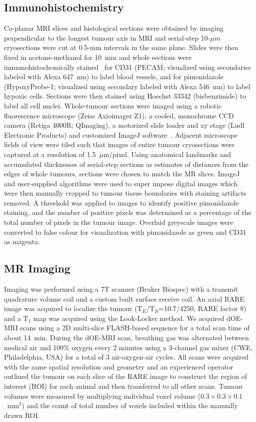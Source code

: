 \subsection{Immunohistochemistry}
Co-planar MRI slices and histological sections were obtained by imaging perpendicular to the longest tumour axis in MRI and serial-step 10-$\mu m$ cryosections were cut at 0.5-mm intervals in the same plane.
Slides were then fixed in acetone-methanol for 10~min and whole sections were immunohistochemically stained~\cite{Kalra:2017is} for CD31 (PECAM; visualized using secondaries labeled with Alexa 647~nm) to label blood vessels, and for pimonidazole (HypoxyProbe-1; visualized using secondary labeled with Alexa 546~nm) to label hypoxic cells. Sections were then stained using Hoechst 33342 (bisbenzimide) to label all cell nuclei.
Whole-tumour sections were imaged using a robotic fluorescence microscope (Zeiss Axioimager Z1), a cooled, monochrome CCD camera (Retiga 4000R; QImaging), a motorized slide loader and xy stage (Ludl Electronic Products) and customized ImageJ software~\cite{Collins:2007jr}. 
Adjacent microscope fields of view were tiled such that images of entire tumour cryosections were captured at a resolution of 1.5~$\mu$m/pixel. 
Using anatomical landmarks and accumulated thicknesses of serial-step sections as estimates of distances from the edges of whole tumours, sections were chosen to match the MR slices. 
ImageJ and user-supplied algorithms were used to super impose digital images which were then manually cropped to tumour tissue boundaries with staining artifacts removed. 
A threshold was applied to images to identify positive pimonidazole staining, and the number of positive pixels was determined as a percentage of the total number of pixels in the tumour image. 
Overlaid greyscale images were converted to false colour for visualization with pimonidazole as green and CD31 as magenta.

\subsection{MR Imaging}
Imaging was performed using a 7T scanner (Bruker Biospec) with a transmit quadrature volume coil and a custom built surface receive coil. 
An axial RARE image was acquired to localize the tumour (T$_E$/T$_R$=10.7/4250, RARE factor 8) and a T$_1$ map was acquired using the Look-Locker method. We acquired
\acs{dOE-MRI} scans using a 2D multi-slice FLASH-based sequence for a total scan time of about 14~min.
During the \ac{dOE-MRI} scan, breathing gas was alternated between medical air and 100\% oxygen every 2 minutes using a 3-channel gas mixer (CWE, Philadelphia, USA) for a total of 3 air-oxygen-air cycles.
All scans were acquired with the same spatial resolution and geometry and an experienced operator outlined the tumour on each slice of the RARE image to construct the region of interest (\acs{ROI}) for each animal and then transferred to all other scans.
Tumour volumes were measured by multiplying individual voxel volume ($0.3\times 0.3\times 0.1$~mm$^3$) and the count of total number of voxels included within the manually drawn \acs{ROI}.

